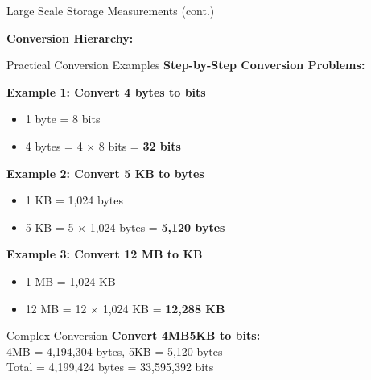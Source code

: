 \documentclass[aspectratio=169]{beamer}
\begin{document}
\begin{frame}{Large Scale Storage Measurements (cont.)} 
    \begin{center}
        \textbf{Conversion Hierarchy:}
        \\
    \end{center}
\end{frame}
\begin{frame}{Practical Conversion Examples}
    \textbf{Step-by-Step Conversion Problems:}
    
    \textbf{Example 1: Convert 4 bytes to bits}
    \begin{itemize}
        \item 1 byte = 8 bits
        \item 4 bytes = 4 × 8 bits = \textbf{32 bits}
    \end{itemize}
    
    \vspace{0.1cm}
    \textbf{Example 2: Convert 5 KB to bytes}
    \begin{itemize}
        \item 1 KB = 1,024 bytes
        \item 5 KB = 5 × 1,024 bytes = \textbf{5,120 bytes}
    \end{itemize}
    
    \vspace{0.1cm}
    \textbf{Example 3: Convert 12 MB to KB}
    \begin{itemize}
        \item 1 MB = 1,024 KB
        \item 12 MB = 12 × 1,024 KB = \textbf{12,288 KB}
    \end{itemize}
    
    \vspace{0.1cm}
    \begin{exampleblock}{Complex Conversion}
        \textbf{Convert 4MB5KB to bits:}
        \\4MB = 4,194,304 bytes, 5KB = 5,120 bytes
        \\Total = 4,199,424 bytes = 33,595,392 bits
    \end{exampleblock}
\end{frame}
\end{document}

